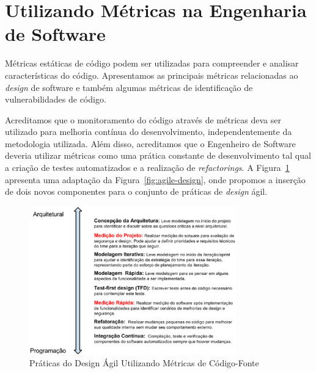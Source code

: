 %

%

\section{Utilizando Métricas na Engenharia de Software}
\label{subsec-security-metrics}

Métricas estáticas de código podem ser utilizadas para compreender e analisar características do código. Apresentamos as principais métricas relacionadas ao \emph{design} de software e também algumas métricas de identificação de vulnerabilidades de código.

%

Acreditamos que o monitoramento do código através de métricas deva ser utilizado para melhoria contínua do desenvolvimento, independentemente da metodologia utilizada. Além disso, acreditamos que o Engenheiro de Software deveria utilizar métricas como uma prática constante de desenvolvimento tal qual a criação de testes automatizados e a realização de \emph{refactorings}. A Figura~\ref{fig:agile-design-metrics} apresenta uma adaptação da Figura~\ref{fig:agile-design}, onde propomos a inserção de dois novos componentes para o conjunto de práticas de \emph{design} ágil.

\graphicspath{{figuras/}}
\begin{figure}[h]
\centering
\includegraphics[width=0.8\textwidth]{DesignAgilComMedicao.eps}
\caption{Práticas do Design Ágil Utilizando Métricas de Código-Fonte}
\label{fig:agile-design-metrics}
\end{figure}

